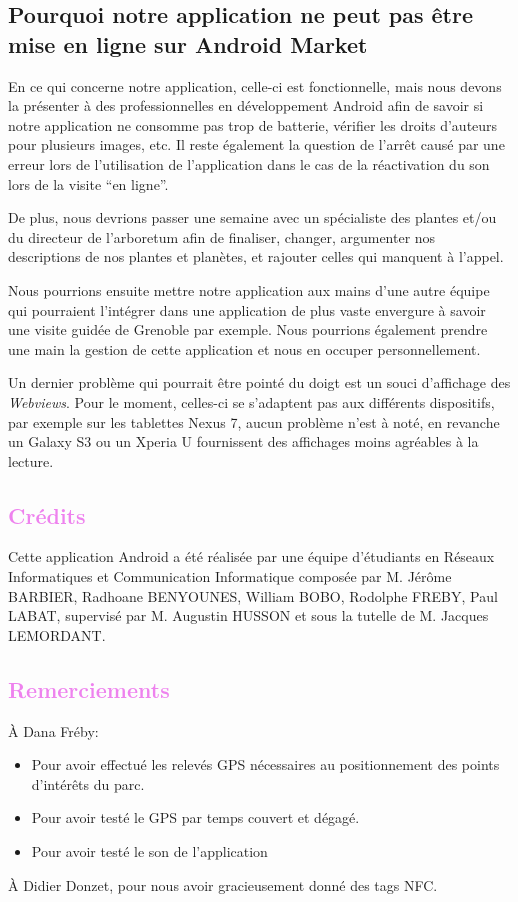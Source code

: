 \documentclass[a4paper,11pt]{article}
\begin{document}
		\textcolor{NavyBlue}{\subsection{Pourquoi notre application ne peut pas être mise en ligne sur Android Market}} 
En ce qui concerne notre application, celle-ci est fonctionnelle, mais nous devons la présenter à des professionnelles en développement Android afin de savoir si notre application ne consomme pas trop de batterie, vérifier les droits d'auteurs pour plusieurs images, etc. Il reste également la question de l'arrêt causé par une erreur lors de l'utilisation de l'application dans le cas de la réactivation du son lors de la visite ``en ligne''.

De plus, nous devrions passer une semaine avec un spécialiste des plantes et/ou du directeur de l'arboretum afin de finaliser, changer, argumenter nos descriptions de nos plantes et planètes, et rajouter celles qui manquent à l'appel.

Nous pourrions ensuite mettre notre application aux mains d'une autre équipe qui pourraient l’intégrer dans une application de plus vaste envergure à savoir une visite guidée de Grenoble par exemple. Nous pourrions également prendre une main la gestion de cette application et nous en occuper personnellement.
		
		Un dernier problème qui pourrait être pointé du doigt est un souci d'affichage des \emph{Webviews}. Pour le moment, celles-ci se s'adaptent pas aux différents dispositifs, par exemple sur les tablettes Nexus 7, aucun problème n'est à noté, en revanche un Galaxy S3 ou un Xperia U fournissent des affichages moins agréables à la lecture.
	\newpage	
    \textcolor{Violet}{\section{Crédits}}
		
    Cette application Android a été réalisée par une équipe d'étudiants en Réseaux Informatiques et Communication Informatique composée par 
    M. Jérôme BARBIER, Radhoane BENYOUNES, William BOBO, Rodolphe FREBY, Paul LABAT, supervisé par M. Augustin HUSSON et sous la tutelle 
    de M. Jacques LEMORDANT.

    \textcolor{Violet}{\section{Remerciements}}
    À Dana Fréby:
    \begin{itemize}
     \item Pour avoir effectué les relevés GPS nécessaires au positionnement des points d'intérêts du parc.
     \item Pour avoir testé le GPS par temps couvert et dégagé. 
     \item Pour avoir testé le son de l'application
    \end{itemize}
    
  À Didier Donzet, pour nous avoir gracieusement donné des tags NFC.
\end{document}
